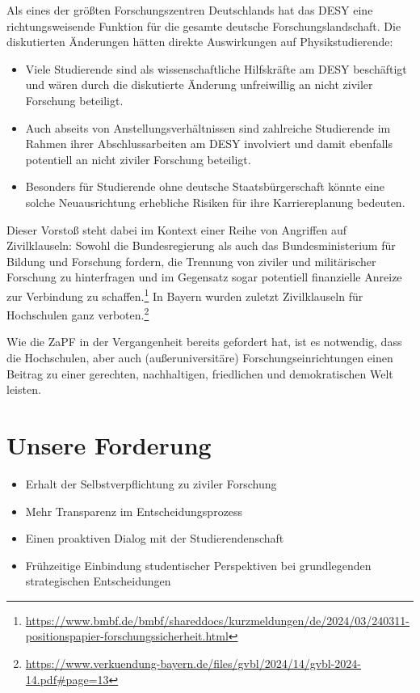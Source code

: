 \documentclass[DIV=calc]{scrartcl}
\begin{document}
Als eines der größten Forschungszentren Deutschlands hat das DESY eine
richtungsweisende Funktion für die gesamte deutsche Forschungslandschaft. Die
diskutierten Änderungen hätten direkte Auswirkungen auf Physikstudierende:
\begin{itemize}
    \item Viele Studierende sind als wissenschaftliche Hilfskräfte am DESY beschäftigt und wären durch die diskutierte Änderung unfreiwillig an nicht ziviler Forschung beteiligt.
    \item Auch abseits von Anstellungsverhältnissen sind zahlreiche Studierende im Rahmen ihrer Abschlussarbeiten am DESY involviert und damit ebenfalls potentiell an nicht ziviler Forschung beteiligt.
    \item Besonders für Studierende ohne deutsche Staatsbürgerschaft könnte eine solche Neuausrichtung erhebliche Risiken für ihre Karriereplanung bedeuten.
\end{itemize}

Dieser Vorstoß steht dabei im Kontext einer Reihe von Angriffen auf Zivilklauseln: Sowohl die Bundesregierung als auch das Bundesministerium für Bildung und Forschung fordern, die Trennung von ziviler und militärischer Forschung zu hinterfragen und im Gegensatz sogar potentiell finanzielle Anreize zur Verbindung zu schaffen.\footnote{\url{https://www.bmbf.de/bmbf/shareddocs/kurzmeldungen/de/2024/03/240311-positionspapier-forschungssicherheit.html}} In Bayern wurden zuletzt Zivilklauseln für Hochschulen ganz verboten.\footnote{\url{https://www.verkuendung-bayern.de/files/gvbl/2024/14/gvbl-2024-14.pdf\#page=13}} 

Wie die ZaPF in der Vergangenheit bereits gefordert hat, ist es notwendig, dass die Hochschulen, aber auch (außeruniversitäre) Forschungseinrichtungen einen Beitrag zu einer gerechten, nachhaltigen, friedlichen und demokratischen Welt leisten.

\section*{Unsere Forderung}
\begin{itemize}
    \item Erhalt der Selbstverpflichtung zu ziviler Forschung
    \item Mehr Transparenz im Entscheidungsprozess
    \item Einen proaktiven Dialog mit der Studierendenschaft
    \item Frühzeitige Einbindung studentischer Perspektiven bei grundlegenden
strategischen Entscheidungen
\end{itemize}
\end{document}
